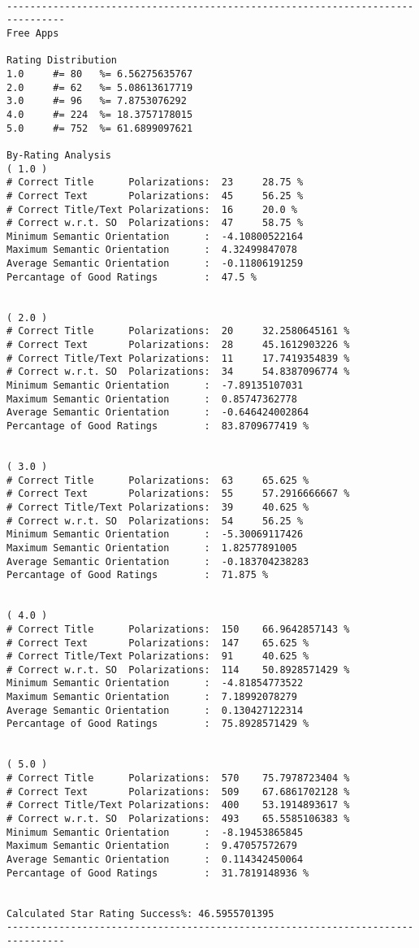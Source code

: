 \documentclass[11pt]{report} %
\begin{document}
\begin{verbatim}

--------------------------------------------------------------------------------
Free Apps

Rating Distribution
1.0 	#= 80 	%= 6.56275635767
2.0 	#= 62 	%= 5.08613617719
3.0 	#= 96 	%= 7.8753076292
4.0 	#= 224 	%= 18.3757178015
5.0 	#= 752 	%= 61.6899097621

By-Rating Analysis
( 1.0 )
# Correct Title      Polarizations:  23 	28.75 %
# Correct Text       Polarizations:  45 	56.25 %
# Correct Title/Text Polarizations:  16 	20.0 %
# Correct w.r.t. SO  Polarizations:  47 	58.75 %
Minimum Semantic Orientation      :  -4.10800522164
Maximum Semantic Orientation      :  4.32499847078
Average Semantic Orientation      :  -0.11806191259
Percantage of Good Ratings        :  47.5 %


( 2.0 )
# Correct Title      Polarizations:  20 	32.2580645161 %
# Correct Text       Polarizations:  28 	45.1612903226 %
# Correct Title/Text Polarizations:  11 	17.7419354839 %
# Correct w.r.t. SO  Polarizations:  34 	54.8387096774 %
Minimum Semantic Orientation      :  -7.89135107031
Maximum Semantic Orientation      :  0.85747362778
Average Semantic Orientation      :  -0.646424002864
Percantage of Good Ratings        :  83.8709677419 %


( 3.0 )
# Correct Title      Polarizations:  63 	65.625 %
# Correct Text       Polarizations:  55 	57.2916666667 %
# Correct Title/Text Polarizations:  39 	40.625 %
# Correct w.r.t. SO  Polarizations:  54 	56.25 %
Minimum Semantic Orientation      :  -5.30069117426
Maximum Semantic Orientation      :  1.82577891005
Average Semantic Orientation      :  -0.183704238283
Percantage of Good Ratings        :  71.875 %


( 4.0 )
# Correct Title      Polarizations:  150 	66.9642857143 %
# Correct Text       Polarizations:  147 	65.625 %
# Correct Title/Text Polarizations:  91 	40.625 %
# Correct w.r.t. SO  Polarizations:  114 	50.8928571429 %
Minimum Semantic Orientation      :  -4.81854773522
Maximum Semantic Orientation      :  7.18992078279
Average Semantic Orientation      :  0.130427122314
Percantage of Good Ratings        :  75.8928571429 %


( 5.0 )
# Correct Title      Polarizations:  570 	75.7978723404 %
# Correct Text       Polarizations:  509 	67.6861702128 %
# Correct Title/Text Polarizations:  400 	53.1914893617 %
# Correct w.r.t. SO  Polarizations:  493 	65.5585106383 %
Minimum Semantic Orientation      :  -8.19453865845
Maximum Semantic Orientation      :  9.47057572679
Average Semantic Orientation      :  0.114342450064
Percantage of Good Ratings        :  31.7819148936 %


Calculated Star Rating Success%: 46.5955701395
--------------------------------------------------------------------------------

\end{verbatim}
\end{document}
